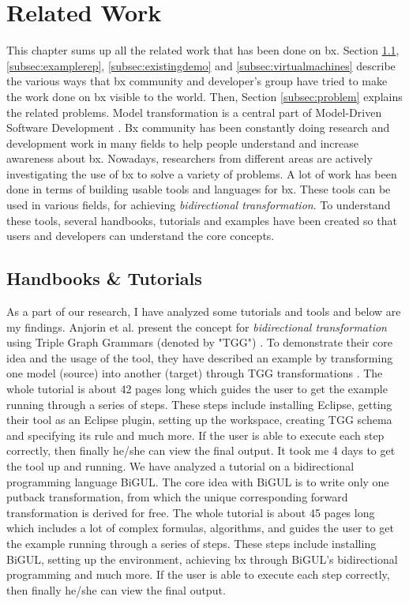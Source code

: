 \section{Related Work}\label{sec:relatedwork}
This chapter sums up all the related work that has been done on bx. Section \ref{subsec:handbook}, \ref{subsec:examplerep}, \ref{subsec:existingdemo} and \ref{subsec:virtualmachines} describe the various ways that bx community and developer's group have tried to make the work done on bx visible to the world. Then, Section \ref{subsec:problem} explains the related problems. 
\newline\newline Model transformation is a central part of Model-Driven Software Development \cite{bx-grace} \cite{bx-dagstuhl}. Bx community has been constantly doing research and development work in many fields to help people understand and increase awareness about bx. Nowadays, researchers from different areas are actively investigating the use of bx to solve a variety of problems. A lot of work has been done in terms of building usable tools and languages for bx. These tools can be used in various fields, for achieving \textit{bidirectional transformation}. To understand these tools, several handbooks, tutorials and examples have been created so that users and developers can understand the core concepts. 
\subsection{Handbooks \& Tutorials}\label{subsec:handbook}
As a part of our research, I have analyzed some tutorials and tools and below are my findings.
\newline\newline Anjorin et al.\cite{emoflon-part4} present the concept for \textit{bidirectional transformation} using Triple Graph Grammars (denoted by "TGG") \cite{tgg}. To demonstrate their core idea and the usage of the tool, they have described an example by transforming one model (source) into another (target) through TGG transformations \cite{tgg}\cite{bx-tgg}. The whole tutorial is about 42 pages long which guides the user to get the example running through a series of steps. These steps include installing \ac{Eclipse}, getting their tool as an Eclipse plugin, setting up the workspace, creating TGG schema and specifying its rule and much more. If the user is able to execute each step correctly, then finally he/she can view the final output. It took me 4 days to get the tool up and running.
\newline\newline We have analyzed a tutorial\cite{bigul-tutorial} on a bidirectional programming language BiGUL\cite{bigul}. The core idea with BiGUL is to write only one putback transformation, from which the unique corresponding forward transformation is derived for free. The whole tutorial is about 45 pages long which includes a lot of complex formulas, algorithms, and guides the user to get the example running through a series of steps. These steps include installing BiGUL, setting up the environment, achieving bx through BiGUL's bidirectional programming and much more. If the user is able to execute each step correctly, then finally he/she can view the final output. 

